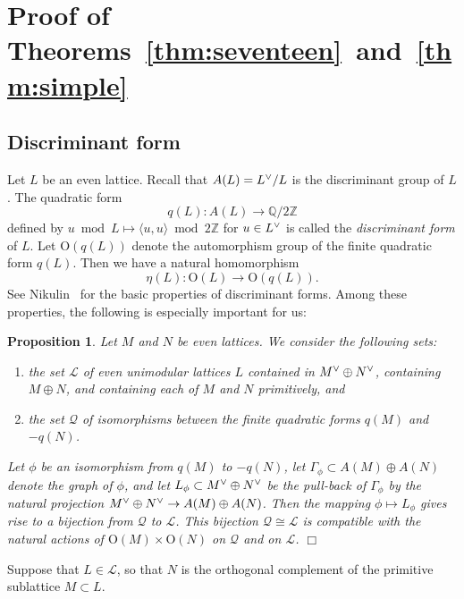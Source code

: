 \documentclass{amsart}
\newtheorem{proposition}[theorem]{Proposition}
\numberwithin{equation}{section}
\numberwithin{table}{section}
\numberwithin{figure}{section}
\newcommand{\Q}{\mathord{\mathbb  Q}}
\newcommand{\Z}{\mathord{\mathbb Z}}
\newcommand{\LLL}{\mathord{\mathcal L}}
\newcommand{\QQQ}{\mathord{\mathcal Q}}
\newcommand{\dual}{\sp{\vee}}
\newcommand{\OG}{\mathord{\mathrm{O}}}
\newcommand{\intf}[1]{\langle #1 \rangle}
\renewcommand{\qed}{\hfill {$\Box$}}
\begin{document}
\section{Proof of Theorems~\ref{thm:seventeen}~and~\ref{thm:simple}}\label{sec:proof}
%
\subsection{Discriminant form}\label{subsec:discform}
%
Let $L$ be an even lattice.
Recall that $A(L)=L\dual/L$ is the discriminant group of $L$.
The  quadratic form
\[
q(L)\colon A(L)\to \Q/2\Z
\]
defined by $u \bmod L \mapsto \intf{u,u}\bmod 2\Z$ for $u\in L\dual$
is called the \emph{discriminant form} of $L$.
Let $\OG(q(L))$ denote the automorphism group of the finite quadratic form $q(L)$.
Then we have a natural homomorphism
\[
\eta(L)\colon \OG(L)\to \OG(q(L)).
\]
See Nikulin~\cite{Nikulin1979} for the basic properties of discriminant forms.
Among these properties, the following is especially important for us:
%
\begin{proposition}\label{prop:overlat}
Let $M$ and $N$ be even lattices.
We consider the following sets:
%
\begin{enumerate}[\rm (a)]
\item the set $\LLL$ of even unimodular lattices $L$ contained in  $M\dual\oplus N\dual$,
containing $M\oplus N$,
and containing each of $M$ and $N$  primitively, and
\item the set $\QQQ$ of isomorphisms between
the finite quadratic forms $q(M)$ and $-q(N)$.
\end{enumerate}
%
Let $\phi$ be an isomorphism from $q(M)$ to $-q(N)$,
let $\varGamma_{\phi}\subset A(M)\oplus A(N)$ denote the graph of $\phi$,
and let $L_{\phi}\subset M\dual\oplus N\dual$ be the pull-back of $\varGamma_{\phi}$
by the natural projection $M\dual\oplus N\dual\to A(M)\oplus A(N)$.
Then the mapping  $\phi\mapsto L_{\phi}$ gives rise to a bijection from $\QQQ$ to $\LLL$.
This  bijection $\QQQ\cong \LLL$
is compatible with the natural actions of $\OG(M)\times \OG(N)$
on $\QQQ$ and on $\LLL$.
\qed
\end{proposition}
%
%
Suppose that $L\in \LLL$,
so that $N$ is the orthogonal complement of the primitive sublattice $M\subset L$.
\end{document}
